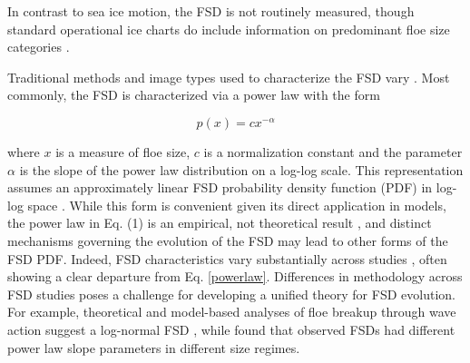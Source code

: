 \documentclass[review, jog]{igs}
\begin{document}
In contrast to sea ice motion, the FSD is not routinely measured, though standard operational ice charts do include information on predominant floe size categories \citep{dedrickUSNationalNaval2001, afanasyevaAARIMethodologySea2019}.

Traditional methods and image types used to characterize the FSD vary \citep{pagetDeterminingFloesizeDistribution2001,  toyota2006_CharacteristicsSea, hwang2013_IntercomparisonSatellite}.
Most commonly, the FSD is characterized via a power law with the form
\begin{linenomath*}
\begin{equation}
    p(x) = cx^{-\alpha} \label{powerlaw}
\end{equation}
\end{linenomath*}
where $x$ is a measure of floe size, $c$ is a normalization constant and the parameter $\alpha$ is the slope of the power law distribution on a log-log scale. This representation assumes an approximately linear FSD probability density function (PDF) in log-log space  \citep{rothrock1984_MeasuringSea}. 
While this form is convenient given its direct application in models, the power law in Eq. (1) is an empirical, not theoretical result \citep{herman2010_SeaiceFloesize}, and distinct mechanisms governing the evolution of the FSD may lead to other forms of the FSD PDF. 
Indeed, FSD characteristics vary substantially across studies \citep{stern2018_ReconcilingDisparate}, often showing a clear departure from Eq. \ref{powerlaw}.
Differences in methodology across FSD studies poses a challenge for developing a unified theory for FSD evolution.
For example, theoretical and model-based analyses of floe breakup through wave action suggest a log-normal FSD \citep{montiel2022_TheoreticalFrameworka, mokus2022_WavetriggeredBreakup}, while \cite{toyotaSizeDistributionShape2011} found that observed FSDs had different power law slope parameters in different size regimes.
\end{document}
